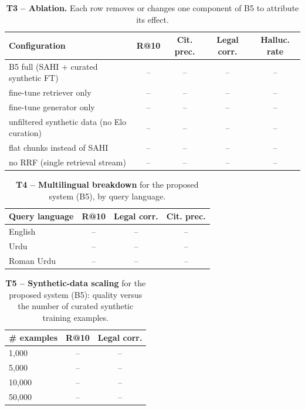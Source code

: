 \documentclass[10pt,twocolumn]{article}
\renewcommand{\arraystretch}{1.25}
\newcommand{\tbd}{\textcolor{black!45}{--}}
\begin{document}
\begin{table}[t]
\centering
\caption{\textbf{T3 -- Ablation.} Each row removes or changes one component of B5 to attribute its effect.}
\label{tab:rd-t3}
\footnotesize
\setlength{\tabcolsep}{6pt}
\renewcommand{\arraystretch}{1.3}
\begin{tabularx}{\textwidth}{>{\raggedright\arraybackslash}X cccc}
\toprule
\textbf{Configuration} & \textbf{R@10} & \textbf{Cit. prec.} & \textbf{Legal corr.} & \textbf{Halluc. rate} \\
\midrule
B5 full (SAHI + curated synthetic FT) & \tbd & \tbd & \tbd & \tbd \\
\quad fine-tune retriever only & \tbd & \tbd & \tbd & \tbd \\
\quad fine-tune generator only & \tbd & \tbd & \tbd & \tbd \\
\quad unfiltered synthetic data (no Elo curation) & \tbd & \tbd & \tbd & \tbd \\
\quad flat chunks instead of SAHI & \tbd & \tbd & \tbd & \tbd \\
\quad no RRF (single retrieval stream) & \tbd & \tbd & \tbd & \tbd \\
\bottomrule
\end{tabularx}
\end{table}

\begin{table}[t]
\centering
\caption{\textbf{T4 -- Multilingual breakdown} for the proposed system (B5), by query language.}
\label{tab:rd-t4}
\footnotesize
\setlength{\tabcolsep}{6pt}
\renewcommand{\arraystretch}{1.3}
\begin{tabularx}{\textwidth}{>{\raggedright\arraybackslash}X ccc}
\toprule
\textbf{Query language} & \textbf{R@10} & \textbf{Legal corr.} & \textbf{Cit. prec.} \\
\midrule
English & \tbd & \tbd & \tbd \\
Urdu & \tbd & \tbd & \tbd \\
Roman Urdu & \tbd & \tbd & \tbd \\
\bottomrule
\end{tabularx}
\end{table}

\begin{table}[t]
\centering
\caption{\textbf{T5 -- Synthetic-data scaling} for the proposed system (B5): quality versus the number
of curated synthetic training examples.}
\label{tab:rd-t5}
\footnotesize
\setlength{\tabcolsep}{6pt}
\renewcommand{\arraystretch}{1.3}
\begin{tabular}{p{2.4cm} cc}
\toprule
\textbf{\# examples} & \textbf{R@10} & \textbf{Legal corr.} \\
\midrule
1{,}000 & \tbd & \tbd \\
5{,}000 & \tbd & \tbd \\
10{,}000 & \tbd & \tbd \\
50{,}000 & \tbd & \tbd \\
\bottomrule
\end{tabular}
\end{table}
\end{document}
